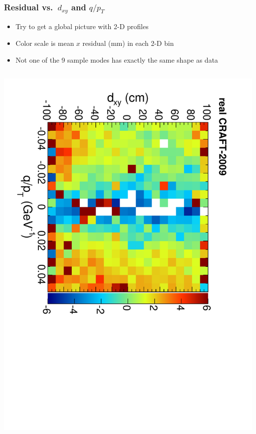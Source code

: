 \documentclass[compress]{beamer}
\begin{document}
\begin{frame}
\frametitle{Residual vs.~$d_{xy}$ and $q/p_T$}

\begin{itemize}
\item Try to get a global picture with 2-D profiles
\item Color scale is mean $x$ residual (mm) in each 2-D bin
\item Not one of the 9 sample modes has exactly the same shape as data
\end{itemize}

\begin{columns}
\includegraphics[height=\linewidth, angle=90]{residx-dxy-qoverpt_real.pdf}


\end{columns}
\end{frame}
\end{document}
